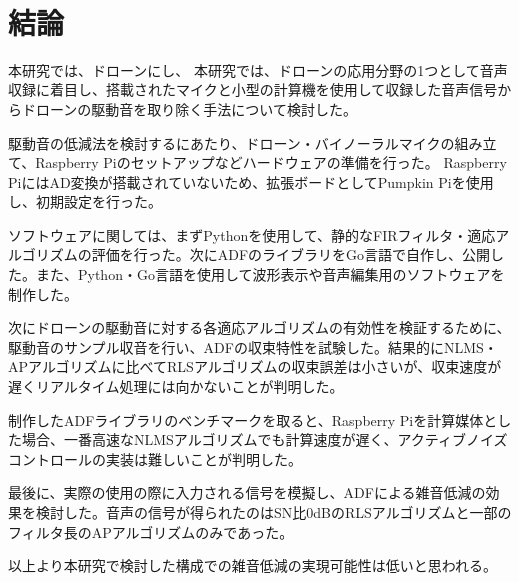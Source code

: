 \
\chapter{結論}\label{conclusion}

本研究では、ドローンにし、
本研究では、ドローンの応用分野の1つとして音声収録に着目し、搭載されたマイクと小型の計算機を使用して収録した音声信号からドローンの駆動音を取り除く手法について検討した。

駆動音の低減法を検討するにあたり、ドローン・バイノーラルマイクの組み立て、Raspberry
Piのセットアップなどハードウェアの準備を行った。 Raspberry
PiにはAD変換が搭載されていないため、拡張ボードとしてPumpkin
Piを使用し、初期設定を行った。

ソフトウェアに関しては、まずPythonを使用して、静的なFIRフィルタ・適応アルゴリズムの評価を行った。次にADFのライブラリをGo言語で自作し、公開した。また、Python・Go言語を使用して波形表示や音声編集用のソフトウェアを制作した。

次にドローンの駆動音に対する各適応アルゴリズムの有効性を検証するために、駆動音のサンプル収音を行い、ADFの収束特性を試験した。結果的にNLMS・APアルゴリズムに比べてRLSアルゴリズムの収束誤差は小さいが、収束速度が遅くリアルタイム処理には向かないことが判明した。

制作したADFライブラリのベンチマークを取ると、Raspberry
Piを計算媒体とした場合、一番高速なNLMSアルゴリズムでも計算速度が遅く、アクティブノイズコントロールの実装は難しいことが判明した。

最後に、実際の使用の際に入力される信号を模擬し、ADFによる雑音低減の効果を検討した。音声の信号が得られたのはSN比0dBのRLSアルゴリズムと一部のフィルタ長のAPアルゴリズムのみであった。

以上より本研究で検討した構成での雑音低減の実現可能性は低いと思われる。
